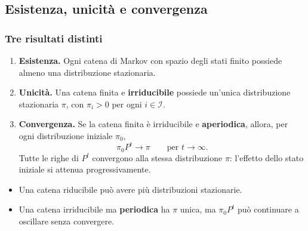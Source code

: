 \documentclass[handout]{beamer}%
\newenvironment{stepenumerate}{\begin{enumerate}[<+->]}{\end{enumerate}}
\newenvironment{stepitemize}{\begin{itemize}[<+->]}{\end{itemize} }
\providecommand{\QTR}[2]{\csname #1\endcsname{#2}}
\begin{document}


\subsection{Esistenza, unicit\`{a} e convergenza}%

\begin{frame}%
%

\frametitle{Tre risultati distinti}%
%

%


\begin{stepenumerate}
\item[1.] \textbf{Esistenza.} Ogni catena di Markov con spazio degli stati
finito possiede almeno una distribuzione stazionaria.

\item[2.] \textbf{Unicit\`{a}.} Una catena finita e \textbf{irriducibile}
possiede un'unica distribuzione stazionaria $\pi$, con $\pi_{i}>0$ per ogni
$i\in\mathcal{I}$.

\item[3.] \textbf{Convergenza.} Se la catena finita \`{e} irriducibile e
\textbf{aperiodica}, allora, per ogni distribuzione iniziale $\pi_{0}$,
\[
\pi_{0}P^{t}\longrightarrow\pi\qquad\text{per }t\longrightarrow\infty.
\]
Tutte le righe di $P^{t}$ convergono alla stessa distribuzione $\pi$:
l'effetto dello stato iniziale si attenua progressivamente.
\end{stepenumerate}

\medskip

\begin{stepitemize}


\item Una catena riducibile pu\`{o} avere pi\`{u} distribuzioni stazionarie.

\item Una catena irriducibile ma \textbf{periodica} ha $\pi$ unica, ma
$\pi_{0}P^{t}$ pu\`{o} continuare a oscillare senza convergere.
\end{stepitemize}%

\transboxout
\end{frame}%
\end{document}
